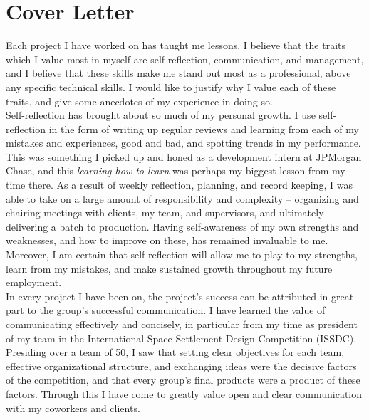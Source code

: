 \documentclass{article}
\begin{document}
\section{Cover Letter}

Each project I have worked on has taught me lessons. I believe that the traits
which I value most in myself are self-reflection, communication, and
management, and I believe that these skills make me stand out most as a
professional, above any specific technical skills. I would like to justify why
I value each of these traits, and give some anecdotes of my experience in doing
so.\\

Self-reflection has brought about so much of my personal growth.
I use self-reflection in the form of writing up regular reviews and learning
from each of my mistakes and experiences, good and bad, and spotting trends in
my performance. This was something I picked up and honed as a development
intern at JPMorgan Chase, and this \textit{learning how to learn} was perhaps
my biggest lesson from my time there. As a result of weekly reflection,
planning, and record keeping, I was able to take on a large amount of
responsibility and complexity -- organizing and chairing meetings with clients,
my team, and supervisors, and ultimately delivering a batch to production.
Having self-awareness of my own strengths and weaknesses, and how to improve on
these, has remained invaluable to me. Moreover, I am certain that
self-reflection will allow me to play to my strengths, learn from my mistakes,
and make sustained growth throughout my future employment.\\

In every project I have been on, the project's success can be attributed in
great part to the group's successful communication. I have learned the value of
communicating effectively and concisely, in particular from my time as
president of my team in the International Space Settlement Design Competition
(ISSDC). Presiding over a team of 50, I saw that setting clear objectives for
each team, effective organizational structure, and exchanging ideas were the
decisive factors of the competition, and that every group's final products were
a product of these factors. Through this I have come to greatly value open and
clear communication with my coworkers and clients.\\
\end{document}
